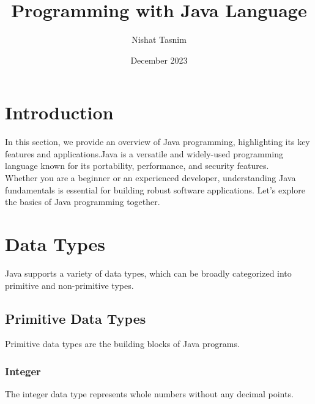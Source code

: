 \documentclass{article}
\title{Programming with Java Language}
\author{Nishat Tasnim}
\date{December 2023}
\begin{document}
\maketitle
\vspace{-5mm}
\begin{center}
\end{center}

\section{Introduction}
In this section, we provide an overview of Java programming, highlighting its key features and applications.Java is a versatile and widely-used programming language known for its portability, performance, and security features.\\ Whether you are a beginner or an experienced developer, understanding Java fundamentals is essential for building robust software applications. Let's explore the basics of Java programming together.

\begin{comment}
    In this section, we provide an overview of Java programming, highlighting its key features and applications. Java is a versatile and widely-used programming language known for its portability, performance, and security features. Whether you are a beginner or an experienced developer, understanding Java fundamentals is essential for building robust software applications. Let's explore the basics of Java programming together.
\end{comment}

\section{Data Types}
Java supports a variety of data types, which can be broadly categorized into primitive and non-primitive types.

\subsection{Primitive Data Types}
Primitive data types are the building blocks of Java programs.

\subsubsection{Integer}
The integer data type represents whole numbers without any decimal points.
\end{document}
